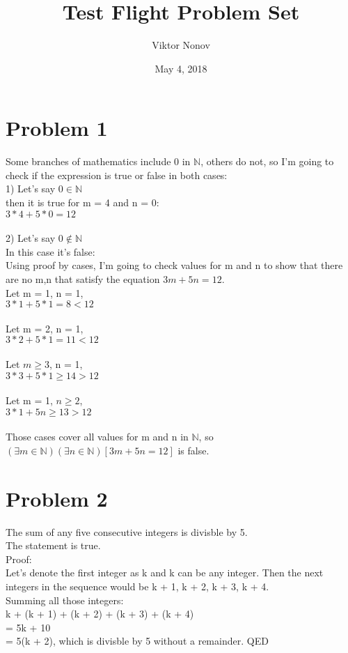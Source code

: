 \documentclass{article}
\title{Test Flight Problem Set}
\author{Viktor Nonov}
\date{May 4, 2018}
\begin{document}
\section*{Problem 1}
Some branches of mathematics include 0 in $\mathbb{N}$, others do not, so I'm going to check if the expression is true or false in both cases:\\
1) Let's say $0 \in \mathbb{N}$\\
then it is true for m = 4 and n = 0:\\
$3*4 + 5*0 = 12$\\
\\
2) Let's say $0 \not\in \mathbb{N}$\\
In this case it's false:\\
Using proof by cases, I'm going to check values for m and n to show that there are no m,n that satisfy the equation $3m + 5n = 12$.\\
Let m = 1, n = 1,\\
$3*1 + 5*1 = 8 < 12$\\
\\
Let m = 2, n = 1,\\
$3*2 + 5*1 = 11 < 12$\\
\\
Let $m \geq 3$, n = 1,\\
$3*3 + 5*1 \geq 14 > 12$\\
\\
Let m = 1, $n \geq 2$,\\
$3*1 + 5n \geq 13 > 12$\\
\\
Those cases cover all values for m and n in $\mathbb{N}$, so $(\exists m \in \mathbb{N})(\exists n \in \mathbb{N})[3m + 5n = 12]$ is false.

\section*{Problem 2}
The sum of any five consecutive integers is divisble by 5.\\
The statement is true.\\
Proof:\\
Let's denote the first integer as k and k can be any integer. Then the next integers in the sequence would be k + 1, k + 2, k + 3, k + 4.\\
Summing all those integers:\\
k + (k + 1) + (k + 2) + (k + 3) + (k + 4)\\
= 5k + 10\\
= 5(k + 2), which is divisble by 5 without a remainder. QED\\
\end{document}
